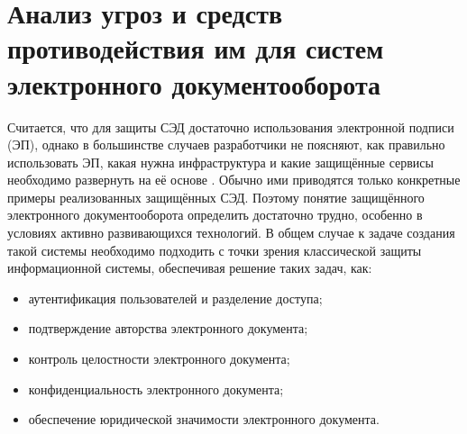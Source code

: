 \section{Анализ угроз и средств противодействия им для систем электронного документооборота} \label{threats_main}

Считается, что для защиты СЭД достаточно использования электронной подписи (ЭП), однако в большинстве случаев разработчики не поясняют, как правильно использовать ЭП, какая нужна инфраструктура и какие защищённые сервисы необходимо развернуть на её основе \cite{buldakova}. Обычно ими приводятся только конкретные примеры реализованных защищённых СЭД. Поэтому понятие защищённого электронного документооборота определить достаточно трудно, особенно в условиях активно развивающихся технологий. В общем случае к задаче создания такой системы необходимо подходить с точки зрения классической защиты информационной системы, обеспечивая решение таких задач, как:
\begin{itemize}
	\item аутентификация пользователей и разделение доступа; 
	\item подтверждение авторства электронного документа; 
	\item контроль целостности электронного документа; 
	\item конфиденциальность электронного документа; 
	\item обеспечение юридической значимости электронного документа.
\end{itemize}

